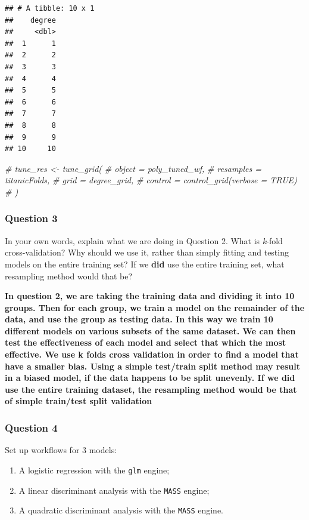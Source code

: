 \documentclass[
]{article}
\newenvironment{Shaded}{\begin{snugshade}}{\end{snugshade}}
\newcommand{\CommentTok}[1]{\textcolor[rgb]{0.56,0.35,0.01}{\textit{#1}}}
\providecommand{\tightlist}{%
  \setlength{\itemsep}{0pt}\setlength{\parskip}{0pt}}
\begin{document}
\begin{verbatim}
## # A tibble: 10 x 1
##    degree
##     <dbl>
##  1      1
##  2      2
##  3      3
##  4      4
##  5      5
##  6      6
##  7      7
##  8      8
##  9      9
## 10     10
\end{verbatim}

\begin{Shaded}
\begin{Highlighting}[]
\CommentTok{\# tune\_res \textless{}{-} tune\_grid(}
\CommentTok{\#   object = poly\_tuned\_wf,}
\CommentTok{\#   resamples = titanicFolds,}
\CommentTok{\#   grid = degree\_grid,}
\CommentTok{\#   control = control\_grid(verbose = TRUE)}
\CommentTok{\# )}
\end{Highlighting}
\end{Shaded}

\hypertarget{question-3}{%
\subsubsection{Question 3}\label{question-3}}

In your own words, explain what we are doing in Question 2. What is
\emph{k}-fold cross-validation? Why should we use it, rather than simply
fitting and testing models on the entire training set? If we
\textbf{did} use the entire training set, what resampling method would
that be?

\textbf{In question 2, we are taking the training data and dividing it
into 10 groups. Then for each group, we train a model on the remainder
of the data, and use the group as testing data. In this way we train 10
different models on various subsets of the same dataset. We can then
test the effectiveness of each model and select that which the most
effective. We use k folds cross validation in order to find a model that
have a smaller bias. Using a simple test/train split method may result
in a biased model, if the data happens to be split unevenly. If we did
use the entire training dataset, the resampling method would be that of
simple train/test split validation}

\hypertarget{question-4}{%
\subsubsection{Question 4}\label{question-4}}

Set up workflows for 3 models:

\begin{enumerate}
\def\labelenumi{\arabic{enumi}.}
\tightlist
\item
  A logistic regression with the \texttt{glm} engine;
\item
  A linear discriminant analysis with the \texttt{MASS} engine;
\item
  A quadratic discriminant analysis with the \texttt{MASS} engine.
\end{enumerate}
\end{document}
